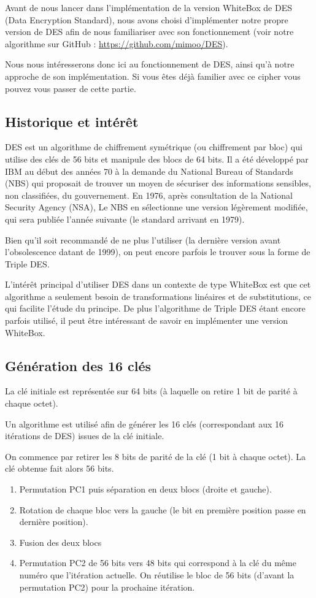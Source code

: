 \documentclass[a4paper,12pt]{article}
\begin{document}
Avant de nous lancer dans l'implémentation de la version WhiteBox de DES (Data Encryption Standard), nous avons choisi d'implémenter notre propre version de DES afin de nous familiariser avec son fonctionnement (voir notre algorithme sur GitHub : \url{https://github.com/mimoo/DES}).
	
Nous nous intéresserons donc ici au fonctionnement de DES, ainsi qu'à notre approche de son implémentation. Si vous êtes déjà familier avec ce cipher vous pouvez vous passer de cette partie.

\subsection{Historique et intérêt}

DES est un algorithme de chiffrement symétrique (ou chiffrement par bloc) qui utilise des clés de 56 bits et manipule des blocs de 64 bits. Il a été développé par IBM au début des années 70 à la demande du National Bureau of Standards (NBS) qui proposait de trouver un moyen de sécuriser des informations sensibles, non classifiées, du gouvernement. En 1976, après consultation de la National Security Agency (NSA), Le NBS en sélectionne une version légèrement modifiée, qui sera publiée l'année suivante (le standard arrivant en 1979).

Bien qu'il soit recommandé de ne plus l'utiliser (la dernière version avant l'obsolescence datant de 1999), on peut encore parfois le trouver sous la forme de Triple DES.
	
L'intérêt principal d'utiliser DES dans un contexte de type WhiteBox est que cet algorithme a seulement besoin de transformations linéaires et de substitutions, ce qui facilite l'étude du principe. De plus l'algorithme de Triple DES étant encore parfois utilisé, il peut être intéressant de savoir en implémenter une version WhiteBox.

\subsection{Génération des 16 clés}	
	
La clé initiale est représentée sur 64 bits (à laquelle on retire 1 bit de parité à chaque octet). 

Un algorithme est utilisé afin de générer les 16 clés (correspondant aux 16 itérations de DES) issues de la clé initiale. 
	
On commence par retirer les 8 bits de parité de la clé (1 bit à chaque octet). La clé obtenue fait alors 56 bits.
\begin{enumerate}
\item Permutation PC1 puis séparation en deux blocs (droite et gauche).
\item Rotation de chaque bloc vers la gauche (le bit en première position passe en dernière position).
\item Fusion des deux blocs
\item Permutation PC2 de 56 bits vers 48 bits qui correspond à la clé du même numéro que l'itération actuelle. On réutilise le bloc de 56 bits (d'avant la permutation PC2) pour la prochaine itération.
\end{enumerate}
\end{document}
